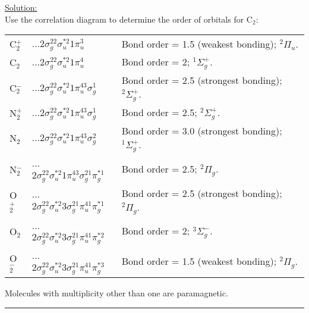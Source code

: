 \noindent
\underline{Solution:}\\

\noindent
Use the correlation diagram to determine the order of orbitals for C$_2$:\\
\begin{tabular}{lll}
C$_2^+$ & ...$2\sigma_g^22\sigma_u^{*2}1\pi_u^3$ 
& Bond order = 1.5 (weakest bonding); $^2\Pi_u$.\\
C$_2$ & ...$2\sigma_g^22\sigma_u^{*2}1\pi_u^4$ 
& Bond order = 2; $^1\Sigma_g^+$.\\
C$_2^-$ & ...$2\sigma_g^22\sigma_u^{*2}1\pi_u^43\sigma_g^1$ 
& Bond order = 2.5 (strongest bonding); $^2\Sigma_g^+$.\\

N$_2^+$ & ...$2\sigma_g^22\sigma_u^{*2}1\pi_u^43\sigma_g^1$ 
& Bond order = 2.5; $^2\Sigma_g^+$.\\
N$_2$ & ...$2\sigma_g^22\sigma_u^{*2}1\pi_u^43\sigma_g^2$ 
& Bond order = 3.0 (strongest bonding); $^1\Sigma_g^+$.\\
N$_2^-$ & ...$2\sigma_g^22\sigma_u^{*2}1\pi_u^43\sigma_g^21\pi_g^{*1}$ 
& Bond order = 2.5; $^2\Pi_g$.\\

O$_2^+$ & ...$2\sigma_g^22\sigma_u^{*2}3\sigma_g^21\pi_u^41\pi_g^{*1}$ 
& Bond order = 2.5 (strongest bonding); $^2\Pi_g$.\\
O$_2$ & ...$2\sigma_g^22\sigma_u^{*2}3\sigma_g^21\pi_u^41\pi_g^{*2}$ 
& Bond order = 2; $^3\Sigma_g^-$.\\
O$_2^-$ & ...$2\sigma_g^22\sigma_u^{*2}3\sigma_g^21\pi_u^41\pi_g^{*3}$ 
& Bond order = 1.5 (weakest bonding); $^2\Pi_g$.\\
\end{tabular}

\vspace*{0.4cm}

\noindent
Molecules with multiplicity other than one are paramagnetic.

\hrule\vspace{0.5cm}


